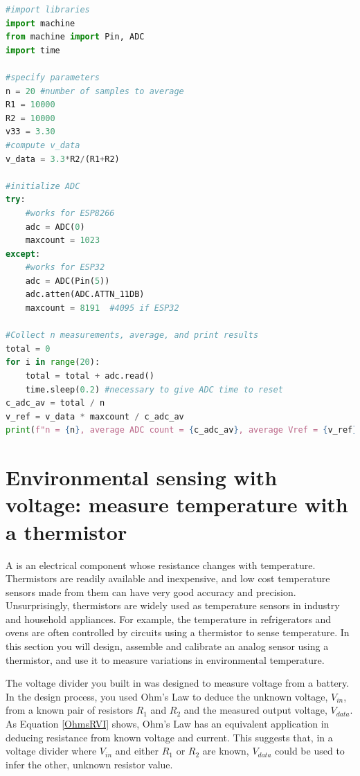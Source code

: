 \begin{lstlisting}[language=Python]
#import libraries
import machine
from machine import Pin, ADC
import time

#specify parameters
n = 20 #number of samples to average
R1 = 10000
R2 = 10000
v33 = 3.30
#compute v_data
v_data = 3.3*R2/(R1+R2)

#initialize ADC
try:
    #works for ESP8266
    adc = ADC(0)
    maxcount = 1023
except:
    #works for ESP32
    adc = ADC(Pin(5))
    adc.atten(ADC.ATTN_11DB)
    maxcount = 8191  #4095 if ESP32

#Collect n measurements, average, and print results
total = 0
for i in range(20):
    total = total + adc.read()
    time.sleep(0.2) #necessary to give ADC time to reset
c_adc_av = total / n 
v_ref = v_data * maxcount / c_adc_av
print(f"n = {n}, average ADC count = {c_adc_av}, average Vref = {v_ref}")
\end{lstlisting}


\section{Environmental sensing with voltage: measure temperature with a thermistor}
A  is an electrical component whose resistance changes with temperature.
Thermistors are readily available and inexpensive, and low cost temperature sensors made from them can have very good accuracy and precision.
Unsurprisingly, thermistors are widely used as temperature sensors in industry and household appliances.
For example, the temperature in refrigerators and ovens are often controlled by circuits using a thermistor to sense temperature.
In this section you will design, assemble and calibrate an analog sensor using a thermistor, and use it to measure variations in environmental temperature.

The voltage divider you built in  was designed to measure voltage from a battery. %
In the design process, you used Ohm's Law to deduce the unknown voltage, $V_{in}$, from a known pair of resistors $R_1$ and $R_2$ and the measured output voltage, $V_{data}$.
As Equation \ref{OhmsRVI} shows, Ohm's Law has an equivalent application in deducing resistance from known voltage and current.
This suggests that, in a voltage divider where $V_{in}$ and either $R_1$ or $R_2$ are known, $V_{data}$ could be used to infer the other, unknown resistor value.

